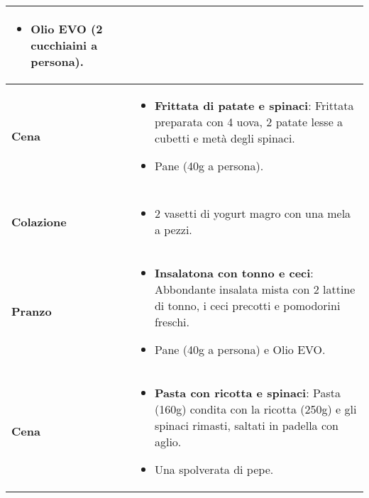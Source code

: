 \documentclass[a4paper, 11pt]{article}
\begin{document}
\begin{tabular}{|>{\bfseries}m{2.5cm}|m{12.5cm}|}
\begin{itemize}[noitemsep, topsep=0pt, leftmargin=*]
    \item Olio EVO (2 cucchiaini a persona).
\end{itemize} \\
\hline
\textbf{Cena} & 
\begin{itemize}[noitemsep, topsep=0pt, leftmargin=*]
    \item \textbf{Frittata di patate e spinaci}: Frittata preparata con 4 uova, 2 patate lesse a cubetti e metà degli spinaci.
    \item Pane (40g a persona).
\end{itemize} \\
\hline
\multicolumn{2}{|c|}{\cellcolor{lightgray}\bfseries MERCOLEDÌ} \\
\hline
\textbf{Colazione} & 
\begin{itemize}[noitemsep, topsep=0pt, leftmargin=*]
    \item 2 vasetti di yogurt magro con una mela a pezzi.
\end{itemize} \\
\hline
\textbf{Pranzo} & 
\begin{itemize}[noitemsep, topsep=0pt, leftmargin=*]
    \item \textbf{Insalatona con tonno e ceci}: Abbondante insalata mista con 2 lattine di tonno, i ceci precotti e pomodorini freschi.
    \item Pane (40g a persona) e Olio EVO.
\end{itemize} \\
\hline
\textbf{Cena} & 
\begin{itemize}[noitemsep, topsep=0pt, leftmargin=*]
    \item \textbf{Pasta con ricotta e spinaci}: Pasta (160g) condita con la ricotta (250g) e gli spinaci rimasti, saltati in padella con aglio.
    \item Una spolverata di pepe.
\end{itemize} \\
\hline
\end{tabular}

\newpage
\end{document}
